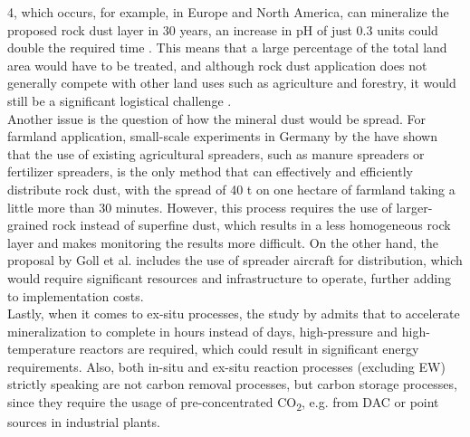 4, which occurs, for example, in Europe and North America, can mineralize the proposed rock dust layer in 30 years, an increase in pH of just 0.3 units could double the required time \parencite{Schuiling2006EnhancedCo2}. This means that a large percentage of the total land area would have to be treated, and although rock dust application does not generally compete with other land uses such as agriculture and forestry, it would still be a significant logistical challenge \parencite{Dipple2021TheSystems}.\\Another issue is the question of how the mineral dust would be spread. For farmland application, small-scale experiments in Germany by the \textcite{CarbonDrawdownInitiative2022HowExperiments} have shown that the use of existing agricultural spreaders, such as manure spreaders or fertilizer spreaders, is the only method that can effectively and efficiently distribute rock dust, with the spread of 40 t on one hectare of farmland taking a little more than 30 minutes. However, this process requires the use of larger-grained rock instead of superfine dust, which results in a less homogeneous rock layer and makes monitoring the results more difficult. On the other hand, the proposal by Goll et al. includes the use of spreader aircraft for distribution, which would require significant resources and infrastructure to operate, further adding to implementation costs.\\Lastly, when it comes to ex-situ processes, the study by \textcite{Lackner1997ProgressSubstrates} admits that to accelerate mineralization to complete in hours instead of days, high-pressure and high-temperature reactors are required, which could result in significant energy requirements. Also, both in-situ and ex-situ reaction processes (excluding EW) strictly speaking are not carbon removal processes, but carbon storage processes, since they require the usage of pre-concentrated CO\textsubscript{2}, e.g. from DAC or point sources in industrial plants.
